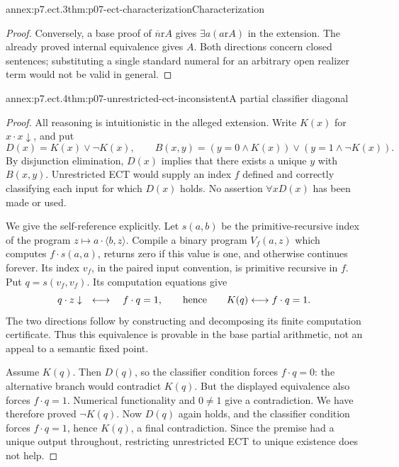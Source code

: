 \begin{annexitem}{annex:p7.ect.3}{thm:p07-ect-characterization}{Characterization}
\begin{proof}
Conversely, a base proof of
\(\overline n\mathrel{\mathrm r}A\) gives
\(\exists a(a\mathrel{\mathrm r}A)\) in the extension.
The already proved internal equivalence gives \(A\).
Both directions concern closed sentences; substituting a single
standard numeral for an arbitrary open realizer term would not be
valid in general.
\end{proof}
\end{annexitem}

\begin{annexitem}{annex:p7.ect.4}{thm:p07-unrestricted-ect-inconsistent}{A partial classifier diagonal}
\begin{proof}
All reasoning is intuitionistic in the alleged extension. Write
\(K(x)\) for \(x\mathbin{\cdot}x\downarrow\), and put
\[
 D(x)=K(x)\lor\neg K(x),\qquad
 B(x,y)=(y=0\land K(x))\lor(y=1\land\neg K(x)).
\]
By disjunction elimination, \(D(x)\) implies that there exists a
unique \(y\) with \(B(x,y)\). Unrestricted ECT would supply
an index \(f\) defined and correctly classifying each input for
which \(D(x)\) holds. No assertion \(\forall xD(x)\) has
been made or used.

We give the self-reference explicitly. Let \(s(a,b)\) be the
primitive-recursive index of the program \(z\mapsto
 a\mathbin{\cdot}\langle b,z\rangle\). Compile a binary
program \(V_f(a,z)\) which computes
\(f\mathbin{\cdot}s(a,a)\), returns zero if this value is one,
and otherwise continues forever. Its index \(v_f\), in the paired
input convention, is primitive recursive in \(f\). Put
\(q=s(v_f,v_f)\). Its computation equations give
\[
 q\mathbin{\cdot}z\downarrow
 \quad\longleftrightarrow\quad
 f\mathbin{\cdot}q=1,
 \qquad\hbox{hence}\qquad
 K(q)\longleftrightarrow f\mathbin{\cdot}q=1.
\]
The two directions follow by constructing and decomposing its finite
computation certificate. Thus this equivalence is provable in the
base partial arithmetic, not an appeal to a semantic fixed point.

Assume \(K(q)\). Then \(D(q)\), so the classifier condition
forces \(f\mathbin{\cdot}q=0\): the alternative branch would
contradict \(K(q)\). But the displayed equivalence also forces
\(f\mathbin{\cdot}q=1\). Numerical functionality and \(0\ne1\)
give a contradiction. We have therefore proved \(\neg K(q)\).
Now \(D(q)\) again holds, and the classifier condition forces
\(f\mathbin{\cdot}q=1\), hence \(K(q)\), a final
contradiction. Since the premise had a unique output throughout,
restricting unrestricted ECT to unique existence does not help.
\end{proof}
\end{annexitem}
